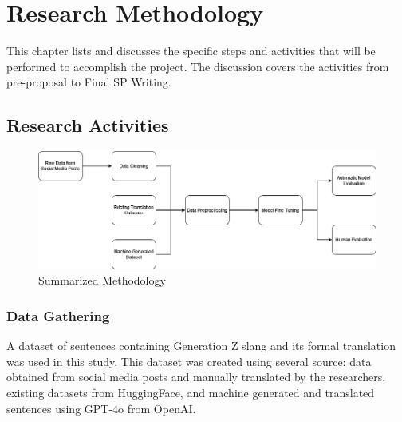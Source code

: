 \chapter{Research Methodology}
This chapter lists and discusses the specific steps and activities that will be performed to accomplish the project. 
The discussion covers the activities from pre-proposal to Final SP Writing.

\section{Research Activities}
\begin{figure}[htbp]
	\centering
	\includegraphics[scale=0.5]{figures/methodology.png}
	\caption{Summarized Methodology}
\end{figure}
\subsection{Data Gathering} 
A dataset of sentences containing Generation Z slang and its formal translation was used in this study. 
This dataset was created using several source: data obtained from social media posts and manually translated by the researchers, existing datasets from HuggingFace, and machine generated and translated sentences using GPT-4o from OpenAI.

